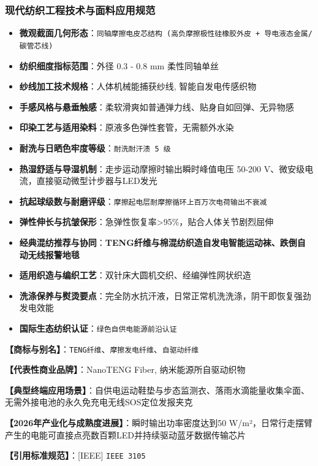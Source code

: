 \documentclass[11pt,openright,twoside,UTF8]{ctexbook}
\begin{document}
\subsubsection*{现代纺织工程技术与面料应用规范}
\begin{itemize} \setlength{\itemsep}{2pt}
    \item \textbf{微观截面几何形态}：\texttt{同轴摩擦电皮芯结构 (高负摩擦极性硅橡胶外皮 + 导电液态金属/碳管芯线)}
    \item \textbf{纺织细度指标范围}：外径 0.3 - 0.8 mm 柔性同轴单丝
    \item \textbf{纱线加工技术规格}：人体机械能捕获纱线, 智能自发电传感织物
    \item \textbf{手感风格与悬垂触感}：柔软滑爽如普通弹力线、贴身自如回弹、无异物感
    \item \textbf{印染工艺与适用染料}：原液多色弹性套管，无需额外水染
    \item \textbf{耐洗与日晒色牢度等级}：\texttt{耐洗耐汗渍 5 级}
    \item \textbf{热湿舒适与导湿机制}：走步运动摩擦时输出瞬时峰值电压 50-200 V、微安级电流，直接驱动微型计步器与LED发光
    \item \textbf{抗起球级数与耐磨评级}：\texttt{摩擦起电层耐摩擦循环上百万次电荷输出不衰减}
    \item \textbf{弹性伸长与抗皱保形}：急弹性恢复率\textgreater{}95\%，贴合人体关节剧烈屈伸
    \item \textbf{经典混纺推荐与协同}：\textbf{TENG纤维与棉混纺织造自发电智能运动袜、跌倒自动无线报警地毯}
    \item \textbf{适用织造与编织工艺}：双针床大圆机交织、经编弹性网状织造
    \item \textbf{洗涤保养与熨烫要点}：完全防水抗汗液，日常正常机洗洗涤，阴干即恢复强劲发电效能
    \item \textbf{国际生态纺织认证}：\texttt{绿色自供电能源前沿认证}
\end{itemize}
\vspace{0.2cm}

\noindent\textbf{【商标与别名】}：\texttt{TENG纤维}、\texttt{摩擦发电纤维}、\texttt{自驱动纤维}\par
\noindent\textbf{【代表性商业品牌】}：NanoTENG Fiber, 纳米能源所自驱动织物\par
\noindent\textbf{【典型终端应用场景】}：自供电运动鞋垫与步态监测衣、落雨水滴能量收集伞面、无需外接电池的永久免充电无线SOS定位发报夹克\par
\noindent\textbf{【2026年产业化与成熟度进展】}：瞬时输出功率密度达到50 W/m²，日常行走摆臂产生的电能可直接点亮数百颗LED并持续驱动蓝牙数据传输芯片\par
\noindent\textbf{【引用标准规范】}：[IEEE] \texttt{IEEE 3105}\par
\vspace{0.5cm}
\end{document}
